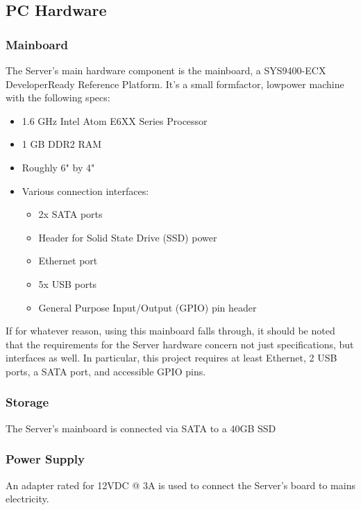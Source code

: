 
\subsection{PC Hardware}

\subsubsection{Mainboard}
The Server's main hardware component is the mainboard, a SYS9400-ECX Developer\-Ready
Reference Platform. It's a small form\-factor, low\-power machine with the following specs:

\begin{itemize}
	\item 1.6 GHz Intel Atom E6XX Series Processor
	\item 1 GB DDR2 RAM
	\item Roughly 6" by 4"
	\item Various connection interfaces:
	\begin{itemize}
		\item 2x SATA ports
		\item Header for Solid State Drive (SSD) power
		\item Ethernet port
		\item 5x USB ports
		\item General Purpose Input/Output (GPIO) pin header
	\end{itemize}
\end{itemize}

If for whatever reason, using this mainboard falls through, it should be noted that the
requirements for the Server hardware concern not just specifications, but interfaces as well.
In particular, this project requires at least Ethernet, 2 USB ports, a SATA port, and accessible
GPIO pins.
\subsubsection{Storage}
The Server's mainboard is connected via SATA to a 40GB SSD

\subsubsection{Power Supply}
An adapter rated for 12VDC @ 3A is used to connect the Server's board to mains electricity.
